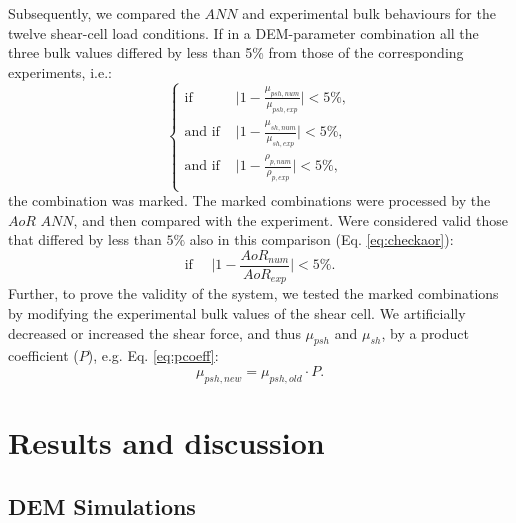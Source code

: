 \documentclass[review]{elsarticle}
\begin{document}
Subsequently, we compared the $ANN$ and experimental bulk behaviours for the
twelve shear-cell load conditions.
If in a DEM-parameter combination all the three bulk values differed by less 
than 5\% from those of the corresponding experiments, i.e.:
\begin{equation}
 \begin{cases}
\text{if } & \lvert{1-\frac{\mu_{psh,num}}{\mu_{psh,exp}}}\rvert < 5\%  ,\\
\text{and if } & \lvert{1-\frac{\mu_{sh,num}}{\mu_{sh,exp}}}\rvert < 5\% , \\ 
\text{and if } & \lvert{1-\frac{\rho_{p,num}}{\rho_{p,exp}}}\rvert < 5\% ,\\ 
\end{cases}
 \label{eq:check2}
\end{equation}
the combination was marked. The marked combinations were processed by the
$AoR$ $ANN$, and then compared with the experiment.
Were considered valid those that differed by less than $5\%$ also in this
comparison (Eq. \ref{eq:checkaor}):
\begin{equation}
\text{if} ~~~~~~ \lvert{1-\frac{AoR_{num}}{AoR_{exp}}}\rvert < 5\% .
\label{eq:checkaor}
\end{equation}
Further, to prove the validity of the system, we tested the marked combinations
by modifying the experimental bulk values of the shear cell. 
We artificially decreased or increased the shear force, and thus $\mu_{psh}$ and
$\mu_{sh}$, by a product coefficient ($P$), e.g. Eq. \ref{eq:pcoeff}:
\begin{equation}
\label{eq:pcoeff}
\mu_{psh, new} = \mu_{psh, old} \cdot P .
\end{equation}

\section{Results and discussion}
\label{sec:results}

\subsection{DEM Simulations}
\label{subsec:simulations}
\end{document}
